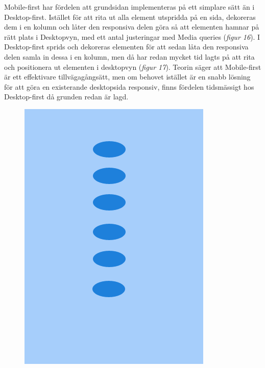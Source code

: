 \documentclass[11pt]{article}
\begin{document}
Mobile-first har fördelen att grundsidan implementeras på ett simplare sätt än i Desktop-first. Istället för att rita ut alla element utspridda på en sida, dekoreras dem i en kolumn och låter den responsiva delen göra så att elementen hamnar på rätt plats i Desktopvyn, med ett antal justeringar med Media queries (\textit{figur 16}). I Desktop-first sprids och dekoreras elementen för att sedan låta den responsiva delen samla in dessa i en kolumn, men då har redan mycket tid lagts på att rita och positionera ut elementen i desktopvyn (\textit{figur 17}). Teorin säger att Mobile-first är ett effektivare tillvägagångsätt, men om behovet istället är en snabb lösning för att göra en existerande desktopsida responsiv, finns fördelen tidsmässigt hos Desktop-first då grunden redan är lagd.
\\
\begin{figure}[H]
\centerline{%
\includegraphics[scale=0.27]{pics/mobiledots.png}\hspace{2em}%
}
\end{figure}
\end{document}
